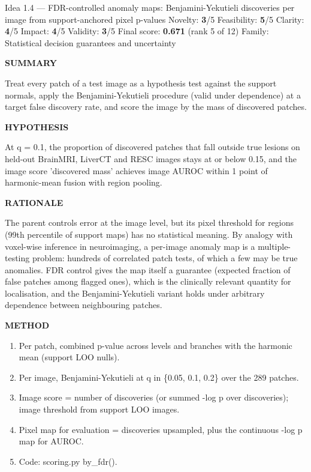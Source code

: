 \documentclass[11pt,a4paper]{article}
\newcommand{\lbl}[1]{{\sffamily\footnotesize\bfseries\color{muted}\MakeUppercase{#1}}\par}
\begin{document}
\begin{ideabox}{Idea 1.4 — FDR-controlled anomaly maps: Benjamini-Yekutieli discoveries per image from support-anchored pixel p-values}
{\small Novelty: \textbf{3}/5 \quad Feasibility: \textbf{5}/5 \quad Clarity: \textbf{4}/5 \quad Impact: \textbf{4}/5 \quad Validity: \textbf{3}/5 \quad Final score: \textbf{0.671} (rank 5 of 12) \quad Family: Statistical decision guarantees and uncertainty}\par\smallskip
\lbl{Summary}Treat every patch of a test image as a hypothesis test against the support normals, apply the Benjamini-Yekutieli procedure (valid under dependence) at a target false discovery rate, and score the image by the mass of discovered patches.

\lbl{Hypothesis}At q = 0.1, the proportion of discovered patches that fall outside true lesions on held-out BrainMRI, LiverCT and RESC images stays at or below 0.15, and the image score 'discovered mass' achieves image AUROC within 1 point of harmonic-mean fusion with region pooling.

\lbl{Rationale}The parent controls error at the image level, but its pixel threshold for regions (99th percentile of support maps) has no statistical meaning. By analogy with voxel-wise inference in neuroimaging, a per-image anomaly map is a multiple-testing problem: hundreds of correlated patch tests, of which a few may be true anomalies. FDR control gives the map itself a guarantee (expected fraction of false patches among flagged ones), which is the clinically relevant quantity for localisation, and the Benjamini-Yekutieli variant holds under arbitrary dependence between neighbouring patches.

\lbl{Method}\begin{enumerate}[leftmargin=1.6em,itemsep=1pt,topsep=2pt]
\item Per patch, combined p-value across levels and branches with the harmonic mean (support LOO nulls).
\item Per image, Benjamini-Yekutieli at q in \{0.05, 0.1, 0.2\} over the 289 patches.
\item Image score = number of discoveries (or summed -log p over discoveries); image threshold from support LOO images.
\item Pixel map for evaluation = discoveries upsampled, plus the continuous -log p map for AUROC.
\item Code: scoring.py by\_\allowbreak{}fdr().
\end{enumerate}


\end{ideabox}
\end{document}
